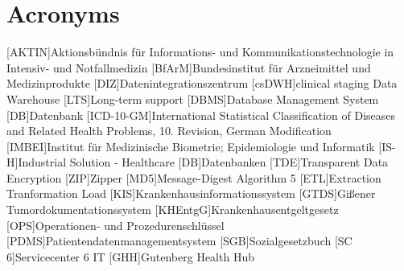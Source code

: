 \chapter*{Acronyms}
    \begin{acronym}[CDW]
    	[AKTIN]{Aktionsbündnis für Informations- und Kommunikationstechnologie in Intensiv- und Notfallmedizin}
    	[BfArM]{Bundesinstitut für Arzneimittel und Medizinprodukte}
    	[DIZ]{Datenintegrationszentrum}
    	[csDWH]{clinical staging Data Warehouse}
    	[LTS]{Long-term support}
    	[DBMS]{Database Management System}
    	[DB]{Datenbank}
    	[ICD-10-GM]{International Statistical Classification of Diseases and Related Health
    		Problems, 10. Revision, German Modification}
    	[IMBEI]{Institut für Medizinische Biometrie; Epidemiologie und Informatik}
    	[IS-H]{Industrial Solution - Healthcare}
    	[DB]{Datenbanken}
    	[TDE]{Transparent Data Encryption}
    	[ZIP]{Zipper}
    	[MD5]{Message-Digest Algorithm 5}    	
    	[ETL]{Extraction Tranformation Load}
    	[KIS]{Krankenhausinformationssystem}
    	[GTDS]{Gißener Tumordokumentationssystem}
    	[KHEntgG]{Krankenhausentgeltgesetz}
    	[OPS]{Operationen- und Prozedurenschlüssel}
    	[PDMS]{Patientendatenmanagementsystem}
    	[SGB]{Sozialgesetzbuch}
    	[SC 6]{Servicecenter 6 IT}
    	[GHH]{Gutenberg Health Hub}
    \end{acronym}
